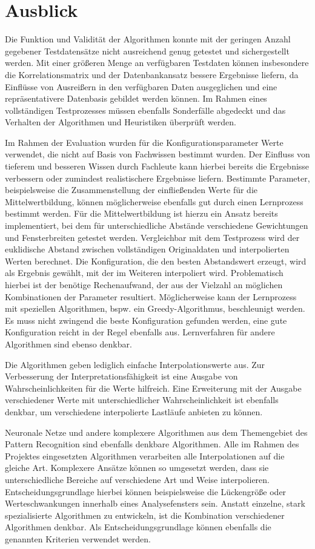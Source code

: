 
\section{Ausblick}

Die Funktion und Validität der Algorithmen konnte mit der geringen Anzahl gegebener Testdatensätze nicht ausreichend genug getestet und sichergestellt werden.
Mit einer größeren Menge an verfügbaren Testdaten können insbesondere die Korrelationsmatrix und der Datenbankansatz bessere Ergebnisse liefern, da Einflüsse von Ausreißern in den verfügbaren Daten ausgeglichen und eine repräsentativere Datenbasis gebildet werden können. Im Rahmen eines vollständigen Testprozesses müssen ebenfalls Sonderfälle abgedeckt und das Verhalten der Algorithmen und Heuristiken überprüft werden.

Im Rahmen der Evaluation wurden für die Konfigurationsparameter Werte verwendet, die nicht auf Basis von Fachwissen bestimmt wurden. Der Einfluss von tieferem und besseren Wissen durch Fachleute kann hierbei bereits die Ergebnisse verbessern oder zumindest realistischere Ergebnisse liefern.
Bestimmte Parameter, beispielsweise die Zusammenstellung der einfließenden Werte für die Mittelwertbildung, können möglicherweise ebenfalls gut durch einen Lernprozess bestimmt werden. Für die Mittelwertbildung ist hierzu ein Ansatz bereits implementiert, bei dem für unterschiedliche Abstände verschiedene Gewichtungen und Fensterbreiten getestet werden. Vergleichbar mit dem Testprozess wird der euklidische Abstand zwischen vollständigen Originaldaten und interpolierten Werten berechnet. Die Konfiguration, die den besten Abstandswert erzeugt, wird als Ergebnis gewählt, mit der im Weiteren interpoliert wird. Problematisch hierbei ist der benötige Rechenaufwand, der aus der Vielzahl an möglichen Kombinationen der Parameter resultiert. Möglicherweise kann der Lernprozess mit speziellen Algorithmen, bspw. ein Greedy-Algorithmus, beschleunigt werden. Es muss nicht zwingend die beste Konfiguration gefunden werden, eine gute Konfiguration reicht in der Regel ebenfalls aus. Lernverfahren für andere Algorithmen sind ebenso denkbar.

Die Algorithmen geben lediglich einfache Interpolationswerte aus. Zur Verbesserung der Interpretationsfähigkeit ist eine Ausgabe von Wahrscheinlichkeiten für die Werte hilfreich. Eine Erweiterung mit der Ausgabe verschiedener Werte mit unterschiedlicher Wahrscheinlichkeit ist ebenfalls denkbar, um verschiedene interpolierte Lastläufe anbieten zu können.

Neuronale Netze und andere komplexere Algorithmen aus dem Themengebiet des Pattern Recognition sind ebenfalls denkbare Algorithmen. Alle im Rahmen des Projektes eingesetzten Algorithmen verarbeiten alle Interpolationen auf die gleiche Art. Komplexere Ansätze können so umgesetzt werden, dass sie unterschiedliche Bereiche auf verschiedene Art und Weise interpolieren. Entscheidungsgrundlage hierbei können beispielsweise die Lückengröße oder Werteschwankungen innerhalb eines Analysefensters sein.
Anstatt einzelne, stark spezialisierte Algorithmen zu entwickeln, ist die Kombination verschiedener Algorithmen denkbar. Als Entscheidungsgrundlage können ebenfalls die genannten Kriterien verwendet werden.